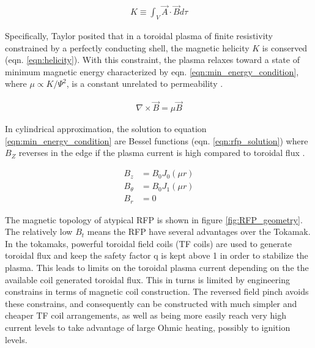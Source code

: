\begin{refsection}
\begin{align}\label{eqn:helicity}
	K \equiv \int_{V} \vec{A} \cdot \vec{B} d\tau
\end{align}

Specifically, Taylor posited that in a toroidal plasma of finite resistivity
constrained by a perfectly conducting shell, the magnetic helicity $K$ is
conserved (eqn. \ref{eqn:helicity}). With this constraint, the plasma relaxes
toward a state of minimum magnetic energy characterized by eqn.
\ref{eqn:min_energy_condition}, where $\mu \varpropto K/ \Psi ^2$, is a
constant unrelated to permeability . 

\begin{align}\label{eqn:min_energy_condition}
    \nabla \times \vec{B} = \mu \vec{B}
\end{align}

In cylindrical approximation, the solution to equation
\ref{eqn:min_energy_condition} are Bessel functions (eqn.
\ref{eqn:rfp_solution}) where $B_Z$ reverses in the edge if the plasma current
is high compared to toroidal flux \cite{Taylor74}.

\begin{align}\label{eqn:rfp_solution}
B_z &= B_0J_0(\mu r)\\
B_\theta &= B_0 J_1(\mu r)\\
B_r & = 0
\end{align}

The magnetic topology of atypical RFP is shown in figure
\ref{fig:RFP_geometry}. The relatively low $B_t$ means the RFP have several
advantages over the Tokamak. In the tokamaks, powerful toroidal field coils (TF
coils) are used to generate toroidal flux and keep the safety factor q is kept
above 1 in order to stabilize the plasma. This leads to limits on the toroidal
plasma current depending on the the available coil generated toroidal flux.
This in turns is limited by engineering constrains in terms of magnetic coil
construction. The reversed field pinch avoids these constrains, and
consequently can be constructed with much simpler and cheaper TF coil
arrangements, as well as being more easily reach very high current levels to
take advantage of large Ohmic heating, possibly to ignition levels.


\end{refsection}

